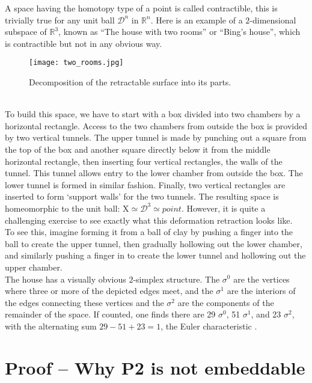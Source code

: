 A space having the homotopy type of a point is called contractible, this is trivially true for any unit ball $\mathcal{D}^{n}$ in $\mathbb{R}^{n}$.
Here is an example of a $2$-dimensional subspace of $\mathbb{R}^{3}$, known as ``The house with two rooms'' or ``Bing's house'', which is contractible but not in any obvious way.
\begin{figure}[ht]
\centering
\texttt{[image: two\_rooms.jpg]}
\caption{Decomposition of the retractable surface into its parts.}
\label{fig:two_rooms}
\end{figure}\\
To build this space, we have to start with a box divided into two chambers by a horizontal rectangle.
Access to the two chambers from outside the box is provided by two vertical tunnels.
The upper tunnel is made by punching out a square from the top of the box and another square directly below it from the middle horizontal rectangle, then inserting four vertical rectangles, the walls of the tunnel.
This tunnel allows entry to the lower chamber from outside the box.
The lower tunnel is formed in similar fashion.
Finally, two vertical rectangles are inserted to form ‘support walls’ for the two tunnels.
The resulting space is homeomorphic to the unit ball: $\mathrm{X} \simeq \mathcal{D}^{3} \simeq point$.
However, it is quite a challenging exercise to see exactly what this deformation retraction looks like.\\
To see this, imagine forming it from a ball of clay by pushing a finger into the ball to create the upper tunnel, then gradually hollowing out the lower chamber, and similarly pushing a finger in to create the lower tunnel and hollowing out the upper chamber.\\
The house has a visually obvious $2$-simplex structure. The $\sigma^{0}$ are the vertices where three or more of the depicted edges meet, and the $\sigma^{1}$ are the interiors of the edges connecting these vertices  and the $\sigma^{2}$ are the components of
the remainder of the space.
If counted, one finds there are 29 $\sigma^{0}$, 51 $\sigma^{1}$, and 23 $\sigma^{2}$, with the alternating sum $29-51+23 = 1$, the Euler characteristic \citep[][cf. pp.4-6]{Hatcher2002}.

\newpage
\vspace*{1ex}
\section{Proof -- Why P2 is not embeddable}
\label{appendix7}

